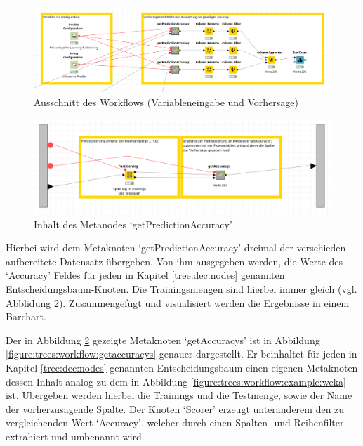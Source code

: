 \documentclass[12pt,					%
							 oneside,			%
							 a4paper,			%
							 halfparskip,		%
							 liststotoc,			%
							 bibtotoc,			%
							 fleqn,				%
							 pointlessnumbers]	%
							 {scrreprt}
\begin{document}
		\begin{figure}[h]
			\begin{center}
				\includegraphics[scale=0.3]{pictures/trees-workflow-gesamt-zoomed.png}
				\caption{Ausschnitt des Workflows (Variableneingabe und Vorhersage)}									
				\label{figure:trees:workflow:zommed}
			\end{center}
		\end{figure}
		
		\begin{figure}[h]
			\begin{center}
				\includegraphics[scale=0.35]{pictures/trees-workflow-partitioning.png}
				\caption{Inhalt des Metanodes `getPredictionAccuracy'}									
				\label{figure:trees:workflow:partitioning}
			\end{center}
		\end{figure}
		
		Hierbei wird dem Metaknoten `getPredictionAccuracy' dreimal der verschieden aufbereitete Datensatz übergeben. Von ihm ausgegeben werden, die Werte des `Accuracy' Feldes für jeden in Kapitel \ref{tree:dec:nodes} genannten Entscheidungsbaum-Knoten. Die Trainingsmengen sind hierbei immer gleich (vgl. Abblidung \ref{figure:trees:workflow:partitioning}). Zusammengefügt und visualisiert werden die Ergebnisse in einem Barchart.
		
		Der in Abbildung \ref{figure:trees:workflow:partitioning}	 gezeigte Metaknoten `getAccuracys' ist in Abbildung \ref{figure:trees:workflow:getaccuracys} genauer dargestellt. Er beinhaltet für jeden in Kapitel \ref{tree:dec:nodes} genannten Entscheidungsbaum einen eigenen Metaknoten dessen Inhalt analog zu dem in Abbildung \ref{figure:trees:workflow:example:weka} ist. Übergeben werden hierbei die Trainings und die Testmenge, sowie der Name der vorherzusagende Spalte. Der Knoten `Scorer' erzeugt unteranderem den zu vergleichenden Wert `Accuracy', welcher durch einen Spalten- und Reihenfilter extrahiert und umbenannt wird.
		
\end{document}
